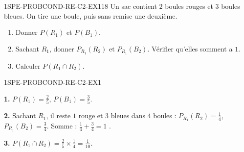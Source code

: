 

\begin{exercice}{1SPE-PROBCOND-RE-C2-EX1}{1}{8}
Un sac contient $2$ boules rouges et $3$ boules bleues. On tire une boule, puis sans remise une deuxième.

\begin{enumerate}
  \item Donner $P(R_1)$ et $P(B_1)$.
  \item Sachant $R_1$, donner $P_{R_1}(R_2)$ et $P_{R_1}(B_2)$. Vérifier qu'elles somment a $1$.
  \item Calculer $P(R_1 \cap R_2)$.
\end{enumerate}
\end{exercice}


\begin{corrige}{1SPE-PROBCOND-RE-C2-EX1}

\textbf{1.} $P(R_1) = \frac{2}{5}$, $P(B_1) = \frac{3}{5}$.

\textbf{2.} Sachant $R_1$, il reste $1$ rouge et $3$ bleues dans $4$ boules : $P_{R_1}(R_2) = \frac{1}{4}$, $P_{R_1}(B_2) = \frac{3}{4}$. Somme : $\frac{1}{4}+\frac{3}{4}=1$ \checkmark.

\textbf{3.} $P(R_1 \cap R_2) = \frac{2}{5} \times \frac{1}{4} = \frac{1}{10}$.
\end{corrige}
